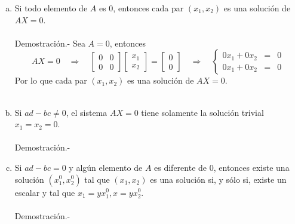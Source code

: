 \begin{enumerate}[\bfseries 1.]
	\begin{enumerate}[(a)]

	    \item Si todo elemento de $A$ es $0$, entonces cada par $(x_1,x_2)$ es una solución de $AX=0$.\\\\
		Demostración.-\; Sea $A=0$, entonces
		$$AX=0 \quad \Rightarrow \quad \left[\begin{array}{*{2}{r}}
		    0 & 0 \\
		    0 & 0
		\end{array}\right]
		\left[\begin{array}{c}
		    x_1 \\
		    x_2
		\end{array}\right] = 
		\left[\begin{array}{c}
		    0 \\
		    0
		\end{array}\right] \quad \Rightarrow \quad 
		\left\{\begin{array}{rcl}
		    0x_1+0x_2 & = & 0 \\
		    0x_1+0x_2 & = & 0 
		\end{array}\right.$$
		Por lo que cada par $(x_1,x_2)$ es una solución de $AX=0$.\\\\

	    \item Si $ad-bc\neq 0$, el sistema $AX=0$ tiene solamente la solución trivial $x_1=x_2=0$.\\\\
		Demostración.-\;

	    \item Si $ad-bc= 0$ y algún elemento de $A$ es diferente de $0$, entonces existe una solución $\left(x_1^0,x_2^0 \right)$ tal que $(x_1,x_2)$ es una solución si, y sólo si, existe un escalar y tal que $x_1=yx_1^0, x=yx_2^0.$\\\\
		Demostración.-\;
	\end{enumerate}

\end{enumerate}

































